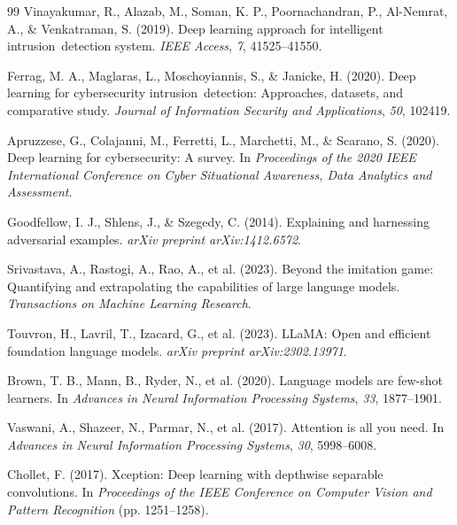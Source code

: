 \documentclass[sensors,apajournal,article,submit,moreauthors]{Definitions/mdpi}
\begin{document}
\begin{thebibliography}{99}
Vinayakumar, R., Alazab, M., Soman, K. P., Poornachandran, P., Al-Nemrat, A., \& Venkatraman, S. (2019). Deep learning approach for intelligent \mbox{intrusion detection} system. \textit{IEEE Access}, \textit{7}, 41525--41550.

Ferrag, M. A., Maglaras, L., Moschoyiannis, S., \& Janicke, H. (2020). Deep learning for cybersecurity \mbox{intrusion detection}: Approaches, datasets, and comparative study. \textit{Journal of Information Security and Applications}, \textit{50}, 102419.

Apruzzese, G., Colajanni, M., Ferretti, L., Marchetti, M., \& Scarano, S. (2020). Deep learning for cybersecurity: A survey. In \textit{Proceedings of the 2020 IEEE International Conference on Cyber Situational Awareness, Data Analytics and Assessment}.

Goodfellow, I. J., Shlens, J., \& Szegedy, C. (2014). Explaining and harnessing adversarial examples. \textit{arXiv preprint arXiv:1412.6572}.

Srivastava, A., Rastogi, A., Rao, A., et al. (2023). Beyond the imitation game: Quantifying and extrapolating the capabilities of large language models. \textit{Transactions on Machine Learning Research}.

Touvron, H., Lavril, T., Izacard, G., et al. (2023). LLaMA: Open and efficient foundation language models. \textit{arXiv preprint arXiv:2302.13971}.

Brown, T. B., Mann, B., Ryder, N., et al. (2020). Language models are few-shot learners. In \textit{Advances in Neural Information Processing Systems}, \textit{33}, 1877--1901.

Vaswani, A., Shazeer, N., Parmar, N., et al. (2017). Attention is all you need. In \textit{Advances in Neural Information Processing Systems}, \textit{30}, 5998--6008.

Chollet, F. (2017). Xception: Deep learning with depthwise separable convolutions. In \textit{Proceedings of the IEEE Conference on Computer Vision and Pattern Recognition} (pp. 1251--1258).


\end{thebibliography}
\end{document}
